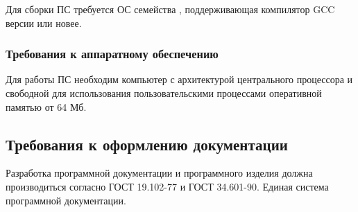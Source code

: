 Для сборки ПС требуется ОС семейства , поддерживающая компилятор GCC версии  или новее.

\subsubsection{Требования к аппаратному обеспечению}
Для работы ПС необходим компьютер с архитектурой центрального процессора  и свободной для использования пользовательскими процессами оперативной памятью от 64 Мб.

\subsection{Требования к оформлению документации}

Разработка программной документации и программного изделия должна производиться согласно ГОСТ 19.102-77 и ГОСТ 34.601-90. Единая система программной документации.
